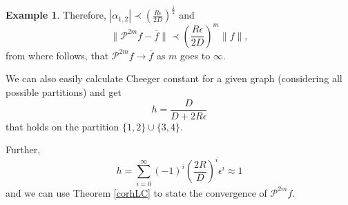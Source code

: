 \documentclass[a4paper,12pt]{amsart}
\theoremstyle{definition}
\newtheorem{example}{Example}
\renewcommand{\P}{\mathcal{P}}
\begin{document}
\begin{example}
Therefore, $|\alpha_{1,2}|\prec \left(\frac{R\epsilon}{2 D}\right)^\frac{1}{2}$ and
 \begin{equation*}
\|\P^{2m} f - \overline f\|\prec \left(\frac{R\epsilon}{2 D}\right)^{m}\|f\|,
\end{equation*}
from where follows, that $\P^{2m} f \to \overline f$ as $m$ goes to $\infty$.

We can also easily calculate Cheeger constant for a given graph (considering all possible partitions) and get 
$$
h=\frac{D}{D+2R\epsilon}
$$ 
that holds on the partition $\{1,2\}\cup\{3,4\}$.

Further, 
$$
h=\sum_{i=0}^\infty (-1)^i\left(\frac{2R}{D}\right)^{i}\epsilon^{i}\approx 1
$$
and we can use Theorem \ref{corhLC} to state the convergence of $\P^{2m} f $.
\end{example}
\end{document}
